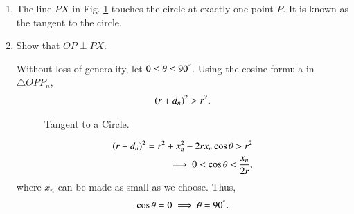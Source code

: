\begin{enumerate}[label=\arabic*.,ref=\thesubsection.\theenumi]
\item
	The line $PX$ in Fig. \ref{ch4_tangent_def} touches the circle at exactly one  point $P$. It is known as the tangent to the circle.

%
%
\item
	Show that $OP \perp PX$.

\solution Without loss of generality, let $0 \le \theta \le 90^{\degree}$. Using the cosine formula in $\triangle OPP_n$,\begin{align}
\left(r+d_n\right)^2 > r^2,
\end{align}
%
\begin{figure}[!ht]
	\begin{center}
		
		\resizebox{\columnwidth}{!}{}
	\end{center}
	\caption{Tangent to a Circle.}
	\label{ch4_tangent_def}	
\end{figure}
%
%		

%
\begin{align}
\left(r+d_n\right)^2 = r^2 + x_n^2 - 2rx_n\cos\theta > r^2 
\\
\implies  0 <\cos\theta < \frac{x_n}{2r},
\end{align}
%
where $x_n$ can be made as small as we choose.  Thus, 
%
\begin{align}
\cos \theta = 0 \implies \theta  = 90 ^{\degree}.
\end{align}


\end{enumerate}

